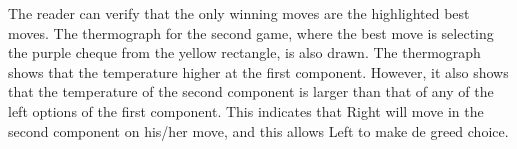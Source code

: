 The reader can verify that the only winning moves are the highlighted best moves. The thermograph for the second game, where the best move is selecting the purple cheque  from the yellow rectangle, is also drawn. The thermograph shows that the temperature higher at the first component. However, it also shows that the temperature of the second component is larger than that of any of the left options of the first component. This indicates that Right will move in the second component on his/her move, and this allows Left to make de greed choice.










